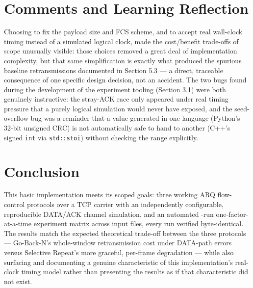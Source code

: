 \documentclass[11pt]{article}
\begin{document}
\section{Comments and Learning Reflection}
Choosing to fix the payload size and FCS scheme, and to accept real wall-clock timing instead of a
simulated logical clock, made the cost/benefit trade-offs of scope unusually visible: those choices
removed a great deal of implementation complexity, but that same simplification is exactly what
produced the spurious baseline retransmissions documented in Section 5.3 --- a direct, traceable
consequence of one specific design decision, not an accident. The two bugs found during the development of the
experiment tooling (Section 3.1) were both genuinely instructive: the stray-ACK race only appeared
under real timing pressure that a purely logical simulation would never have exposed, and the
seed-overflow bug was a reminder that a value generated in one language (Python's 32-bit
unsigned CRC) is not automatically safe to hand to another (C++'s signed \texttt{int} via
\texttt{std::stoi}) without checking the range explicitly.

\section{Conclusion}
This basic implementation meets its scoped goals: three working ARQ flow-control protocols over a
TCP carrier with an independently configurable, reproducible DATA/ACK channel simulation, and an
automated \NumRuns{}-run one-factor-at-a-time experiment matrix across \NumInputs{} input files,
every run verified byte-identical. The results match the expected theoretical trade-off between the
three protocols --- Go-Back-N's whole-window retransmission cost under DATA-path errors versus
Selective Repeat's more graceful, per-frame degradation --- while also surfacing and documenting a
genuine characteristic of this implementation's real-clock timing model rather than presenting the
results as if that characteristic did not exist.
\end{document}

